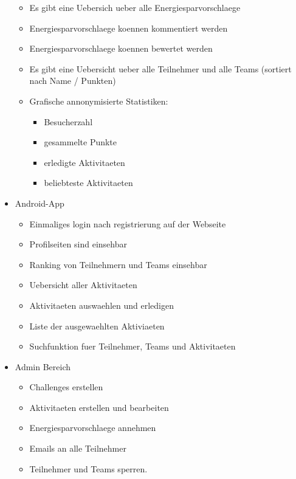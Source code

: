 \documentclass[10pt,a4paper]{article}
\begin{document}
\begin{itemize}
\begin{itemize}
			\item Es gibt eine Uebersich ueber alle Energiesparvorschlaege
			\item Energiesparvorschlaege koennen kommentiert werden
			\item Energiesparvorschlaege koennen bewertet werden
			\item Es gibt eine Uebersicht ueber alle Teilnehmer und alle Teams (sortiert nach Name / Punkten) %
			\item Grafische annonymisierte Statistiken:
			\begin{itemize}
				\item Besucherzahl
				\item gesammelte Punkte
				\item erledigte Aktivitaeten
				\item beliebteste Aktivitaeten
			\end{itemize}
		\end{itemize}
		\item Android-App
		\begin{itemize}
			\item Einmaliges login nach registrierung auf der Webseite
			\item Profilseiten sind einsehbar
			\item Ranking von Teilnehmern und Teams einsehbar
			\item Uebersicht aller Aktivitaeten
			\item Aktivitaeten auswaehlen und erledigen
			\item Liste der ausgewaehlten Aktiviaeten
			\item Suchfunktion fuer Teilnehmer, Teams und Aktivitaeten
			
		\end{itemize}
		\item Admin Bereich
		\begin{itemize}
			\item Challenges erstellen
			\item Aktivitaeten erstellen und bearbeiten
			\item Energiesparvorschlaege annehmen
			\item Emails an alle Teilnehmer
			\item Teilnehmer und Teams sperren.
		\end{itemize}
	\end{itemize}
\end{document}
